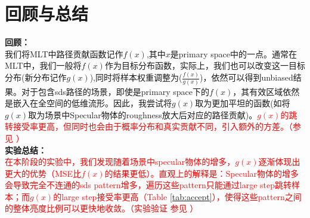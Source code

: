 \section{回顾与总结}
\label{sec:sum}
\noindent \textbf{回顾：}\\
\indent 我们将MLT中路径贡献函数记作$f(x)$,其中$x$是primary space中的一点。通常在MLT中，我们一般将$f(x)$作为目标分布函数，实际上，我们也可以改变这一目标分布(新分布记作$g(x)$),同时将样本权重调整为($\frac{f(x)}{g(x)}$)，依然可以得到unbiased结果。对于包含sds路径的场景，即使是primary space下的$f(x)$，其有效区域依然是嵌入在全空间的低维流形。因此，我尝试将$g(x)$取为更加平坦的函数(如将$g(x)$取为场景中Specular物体的roughness放大后对应的路径贡献)。\textcolor{red}{$g(x)$的跳转接受率更高，但同时也会由于概率分布和真实贡献不同，引入额外的方差。（参见 ）}\\

\noindent \textbf{实验总结：}\\
\indent \textcolor{red}{在本阶段的实验中，我们发现随着场景中specular物体的增多，$g(x)$逐渐体现出更大的优势（MSE比$f(x)$的结果更低）。直观上的解释是：Specular物体的增多会导致完全不连通的sds pattern增多，遍历这些pattern只能通过large step跳转样本；而$g(x)$的large step接受率更高（Table \ref{tab:accept}），使得这些pattern之间的整体亮度比例可以更快地收敛。（实验验证 参见 ）}


